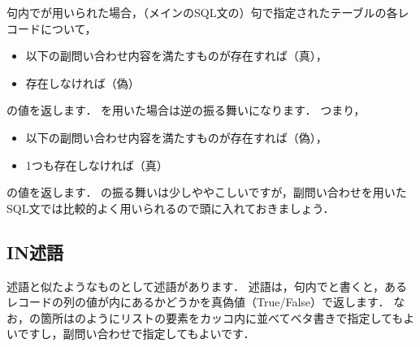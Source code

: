\begin{table}[!htbp]
    \centering
    \caption{テーブル「注文」において，テーブル「関西人気商品」には入っていない商品に関するもので，かつ注文数が5以上のレコードを抽出するSQL文の実行結果}
    \label{tab:subquery-where-not-exists-result}
\end{table}

句内でが用いられた場合，（メインのSQL文の）句で指定されたテーブルの各レコードについて，
\begin{itemize}
\item {}以下の副問い合わせ内容を満たすものが存在すれば（真），
\item 存在しなければ（偽）
\end{itemize}
の値を返します．
を用いた場合は逆の振る舞いになります．
つまり，
\begin{itemize}
\item {}以下の副問い合わせ内容を満たすものが存在すれば（偽），
\item 1つも存在しなければ（真）
\end{itemize}
の値を返します．
の振る舞いは少しややこしいですが，副問い合わせを用いたSQL文では比較的よく用いられるので頭に入れておきましょう．


\subsection{IN述語}
述語と似たようなものとして述語があります．
述語は，句内でと書くと，あるレコードの列の値が内にあるかどうかを真偽値（True/False）で返します．
なお，の箇所はのようにリストの要素をカッコ内に並べてベタ書きで指定してもよいですし，副問い合わせで指定してもよいです．

